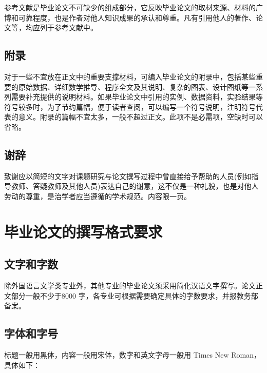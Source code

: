参考文献是毕业论文不可缺少的组成部分，它反映毕业论文的取材来源、材料的广博和可靠程度，也是作者对他人知识成果的承认和尊重。凡有引用他人的著作、论文等，均应列于参考文献中。

\subsection{附录}

对于一些不宜放在正文中的重要支撑材料，可编入毕业论文的附录中，包括某些重要的原始数据、详细数学推导、程序全文及其说明、复杂的图表、设计图纸等一系列需要补充提供的说明材料。如果毕业论文中引用的实例、数据资料，实验结果等符号较多时，为了节约篇幅，便于读者查阅，可以编写一个符号说明，注明符号代表的意义。附录的篇幅不宜太多，一般不超过正文。此项不是必需项，空缺时可以省略。

\subsection{谢辞}

致谢应以简短的文字对课题研究与论文撰写过程中曾直接给予帮助的人员(例如指导教师、答疑教师及其他人员)表达自己的谢意，这不仅是一种礼貌，也是对他人劳动的尊重，是治学者应当遵循的学术规范。内容限一页。

\section{毕业论文的撰写格式要求}
\subsection{文字和字数}

除外国语言文学类专业外，其他专业的毕业论文须采用简化汉语文字撰写。论文正文部分一般不少于8000 字，各专业可根据需要确定具体的字数要求，并报教务部备案。

\subsection{字体和字号}

标题一般用黑体，内容一般用宋体，数字和英文字母一般用 Times New Roman，具体如下：

